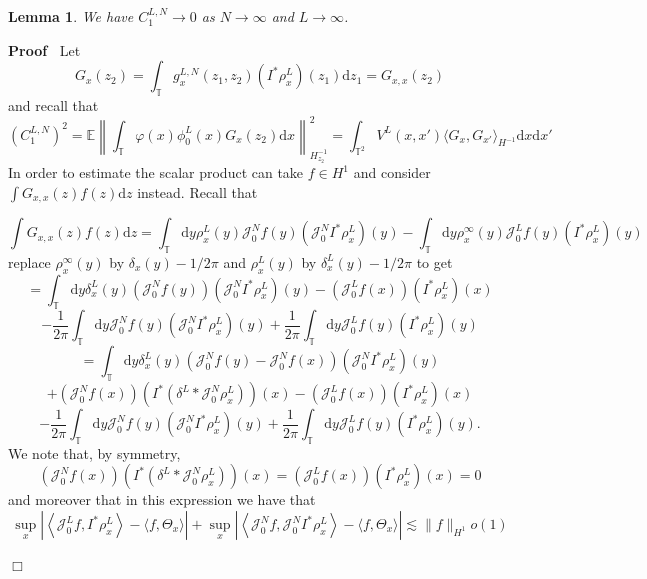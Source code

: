 \documentclass[a4paper,11pt]{article}
\newcommand{\mathd}{\mathrm{d}}
\newenvironment{proof}{\noindent\textbf{Proof\ }}{\hspace*{\fill}$\Box$\medskip}
\newtheorem{lemma}{Lemma}
\newcommand{\JJ}{\mathcal{J}}
\begin{document}
\begin{lemma}
  We have $C_1^{L, N} \rightarrow 0$ as $N \rightarrow \infty$ and $L
  \rightarrow \infty$.
\end{lemma}

\begin{proof}
  Let
  \[ G_x (z_2) = \int_{\mathbb{T}} g_x^{L, N} (z_1, z_2) (I^{\ast} \rho_x^L)
     (z_1) \mathd z_1 = G_{x, x} (z_2) \]
  and recall that
  \[ (C_1^{L, N})^2 =\mathbb{E} \left\| \int_{\mathbb{T}} \varphi (x)
     \phi^L_0 (x) G_x (z_2) \mathd x \right\|_{H^{- 1}_{z_2}}^2 =
     \int_{\mathbb{T}^2} V^L (x, x') \langle G_x, G_{x'} \rangle_{H^{- 1}}
     \mathd x \mathd x' \]
  In order to estimate the scalar product can take $f \in H^1$ and consider
  $\int G_{x, x} (z) f (z) \mathd z$ instead. Recall that
  
  
  \[ \int G_{x, x} (z) f (z) \mathd z = \int_{\mathbb{T}} \mathd y \rho_x^L
     (y) \JJ^N_0 f (y) (\JJ^N_0 I^{\ast} \rho_x^L) (y) - \int_{\mathbb{T}}
     \mathd y \rho_x^{\infty} (y) \JJ^L_0 f (y) (I^{\ast} \rho_x^L) (y) \]
  replace $\rho^{\infty}_x (y)$ by $\delta_x (y) - 1 / 2 \pi$ and $\rho^L_x
  (y)$ by $\delta_x^L (y) - 1 / 2 \pi$ to get
  \[ = \int_{\mathbb{T}} \mathd y \delta_x^L (y) \left( \JJ^N_0 f (y) \right)
     (\JJ^N_0 I^{\ast} \rho_x^L) (y) - \left( \JJ^L_0 f (x) \right) (I^{\ast}
     \rho_x^L) (x) \]
  \[ - \frac{1}{2 \pi} \int_{\mathbb{T}} \mathd y \JJ^N_0 f (y) (\JJ^N_0
     I^{\ast} \rho_x^L) (y) + \frac{1}{2 \pi} \int_{\mathbb{T}} \mathd y
     \JJ^L_0 f (y) (I^{\ast} \rho_x^L) (y) \]
  \[ = \int_{\mathbb{T}} \mathd y \delta_x^L (y) \left( \JJ^N_0 f (y) -
     \JJ^N_0 f (x) \right) (\JJ^N_0 I^{\ast} \rho_x^L) (y) \]
  \[ + \left( \JJ^N_0 f (x) \right) (I^{\ast} \left( \delta^L \ast \JJ^N_0
     \rho_x^L \right)) (x) - \left( \JJ^L_0 f (x) \right) (I^{\ast} \rho_x^L)
     (x) \]
  \[ - \frac{1}{2 \pi} \int_{\mathbb{T}} \mathd y \JJ^N_0 f (y) (\JJ^N_0
     I^{\ast} \rho_x^L) (y) + \frac{1}{2 \pi} \int_{\mathbb{T}} \mathd y
     \JJ^L_0 f (y) (I^{\ast} \rho_x^L) (y) . \]
  We note that, by symmetry,
  \[ \left( \JJ^N_0 f (x) \right) (I^{\ast} \left( \delta^L \ast \JJ^N_0
     \rho_x^L \right)) (x) = \left( \JJ^L_0 f (x) \right) (I^{\ast} \rho_x^L)
     (x) = 0 \]
  and moreover that in this expression we have that
  \[ \sup_x \left| \left\langle \JJ^L_0 f, I^{\ast} \rho_x^L \right\rangle -
     \langle f, \Theta_x^{} \rangle \right| + \sup_x \left| \left\langle
     \JJ^N_0 f, \JJ^N_0 I^{\ast} \rho_x^L \right\rangle - \langle f,
     \Theta_x^{} \rangle \right| \lesssim \| f \|_{H^1} o (1)
  \]

\end{proof}
\end{document}

